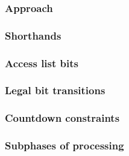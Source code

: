 \subsubsection{Approach                 } \label{rlp txn: phase constraints: access list: approach}              
\subsubsection{Shorthands               } \label{rlp txn: phase constraints: access list: shorthands}            
\subsubsection{Access list bits         } \label{rlp txn: phase constraints: access list: access list bits}      
\subsubsection{Legal bit transitions    } \label{rlp txn: phase constraints: access list: legal transitions}     
\subsubsection{Countdown constraints    } \label{rlp txn: phase constraints: access list: countdowns}            
\subsubsection{Subphases of processing  } \label{rlp txn: phase constraints: access list: access list prefix}    
